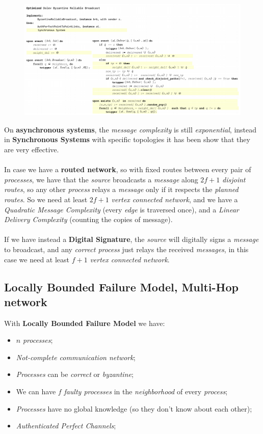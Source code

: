 \documentclass{article}
\begin{document}
\begin{figure}[H]
  \centering
  \includegraphics[scale=0.8,left]{cattura96.png}
\end{figure}
On \textbf{asynchronous systems}, the \emph{message complexity} is still \emph{exponential}, instead in \textbf{Synchronous Systems} with specific topologies it has been show that they are very effective. \\\\
In case we have a \textbf{routed network}, so with fixed routes between every pair of \emph{processes}, we have that the \emph{source} broadcasts a \emph{message} along $2f+1$ \emph{disjoint routes}, so any other \emph{process} relays a \emph{message} only if it respects the \emph{planned routes}. So we need at least $2f+1$ \emph{vertex connected network}, and we have a \emph{Quadratic Message Complexity} (every \emph{edge} is traversed once), and a \emph{Linear Delivery Complexity} (counting the copies of message). \\\\
If we have instead a \textbf{Digital Signature}, the \emph{source} will digitally signs a \emph{message} to broadcast, and any \emph{correct process} just relays the received \emph{messages}, in this case we need at least $f+1$ \emph{vertex connected network}. 
\subsection{Locally Bounded Failure Model, Multi-Hop network}
With \textbf{Locally Bounded Failure Model} we have:
\begin{itemize}
\item $n$ \emph{processes};
\item \emph{Not-complete communication network};
\item \emph{Processes} can be \emph{correct} or \emph{byzantine};
\item We can have $f$ \emph{faulty processes} in the \emph{neighborhood} of every \emph{process};
\item \emph{Processes} have no global knowledge (so they don't know about each other);
\item \emph{Authenticated Perfect Channels};
\end{itemize}
\end{document}
